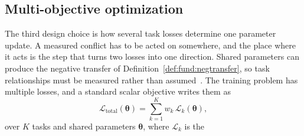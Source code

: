 \subsection{Multi-objective optimization}

The third design choice is how several task losses determine one parameter update. A
measured conflict has to be acted on somewhere, and the place where it acts is the step
that turns two losses into one direction. Shared parameters can produce the negative
transfer of Definition~\ref{def:fund:negtransfer}, so task relationships must be measured
rather than assumed~\cite{standley2020tasks}. The training problem has
multiple losses, and a standard scalar objective writes them as
\begin{equation}\label{eq:fund:mtl-total}
    \mathcal{L}_{\mathrm{total}}(\boldsymbol{\theta})
    = \sum_{k=1}^{K} w_k\,\mathcal{L}_k(\boldsymbol{\theta}),
\end{equation}
over $K$ tasks and shared parameters $\boldsymbol{\theta}$, where $\mathcal{L}_k$ is the
